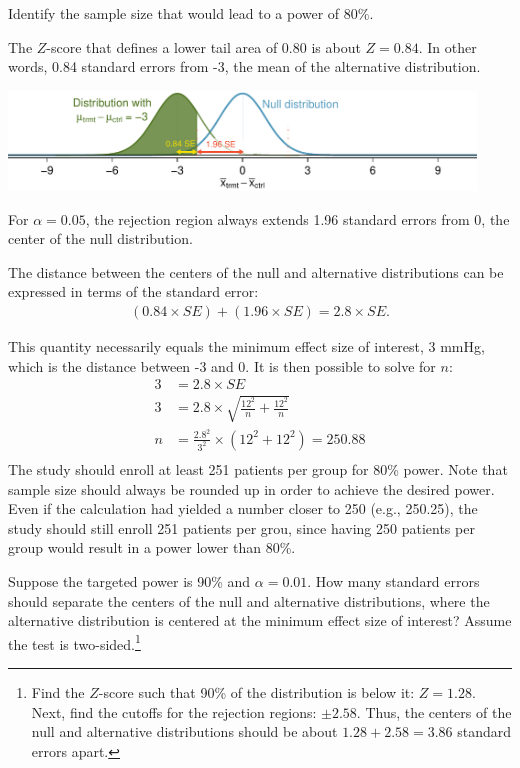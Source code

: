 \begin{example}{Identify the sample size that would lead to a power of 80\%.}

The $Z$-score that defines a lower tail area of 0.80 is about $Z = 0.84$. In other words, 0.84 standard errors from -3, the mean of the alternative distribution. 

\begin{center}
\includegraphics[width=0.93\textwidth]{ch_inference_for_means_oi_biostat/figures/power_best_sample_size/power_best_sample_size}
\end{center}

For $\alpha = 0.05$, the rejection region always extends 1.96 standard errors from 0, the center of the null distribution. 

The distance between the centers of the null and alternative distributions can be expressed in terms of the standard error:
\begin{align*}
(0.84 \times SE) + (1.96 \times SE) = 2.8 \times SE.
\end{align*}

This quantity necessarily equals the minimum effect size of interest, 3 mmHg, which is the distance between -3 and 0. It is then possible to solve for $n$:
\begin{align*}
3 &= 2.8 \times SE \\
3 &= 2.8 \times \sqrt{\frac{12^2}{n} + \frac{12^2}{n}} \\
n &= \frac{2.8^2}{3^2} \times \left( 12^2 + 12^2 \right) = 250.88 \\
\end{align*}
The study should enroll at least 251 patients per group for 80\% power. Note that sample size should always be rounded up in order to achieve the desired power. Even if the calculation had yielded a number closer to 250 (e.g., 250.25), the study should still enroll 251 patients per grou, since having 250 patients per group would result in a power lower than 80\%.
\end{example}

\begin{exercise}
Suppose the targeted power is 90\% and $\alpha = 0.01$. How many standard errors should separate the centers of the null and alternative distributions, where the alternative distribution is centered at the minimum effect size of interest? Assume the test is two-sided.\footnote{Find the $Z$-score such that 90\% of the distribution is below it: $Z = 1.28$. Next, find the cutoffs for the rejection regions: $\pm 2.58$. Thus, the centers of the null and alternative distributions should be about $1.28 + 2.58 = 3.86$ standard errors apart.}
\end{exercise}

